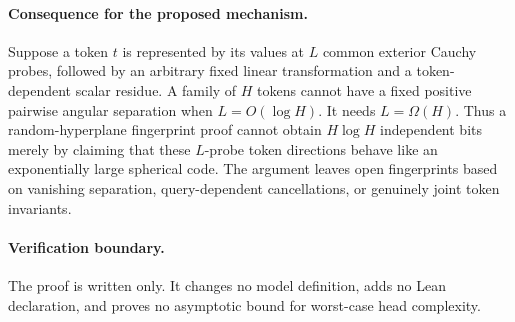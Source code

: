 \documentclass[11pt]{article}
\begin{document}
\paragraph{Consequence for the proposed mechanism.}
Suppose a token $t$ is represented by its values at $L$ common exterior
Cauchy probes, followed by an arbitrary fixed linear transformation
and a token-dependent scalar residue. A family of $H$ tokens cannot
have a fixed positive pairwise angular separation when $L=O(\log H)$.
It needs $L=\Omega(H)$. Thus a random-hyperplane fingerprint proof
cannot obtain $H\log H$ independent bits merely by claiming that these
$L$-probe token directions behave like an exponentially large
spherical code. The argument leaves open fingerprints based on
vanishing separation, query-dependent cancellations, or genuinely
joint token invariants.

\paragraph{Verification boundary.}
The proof is written only. It changes no model definition, adds no
Lean declaration, and proves no asymptotic bound for worst-case head
complexity.
\end{document}
